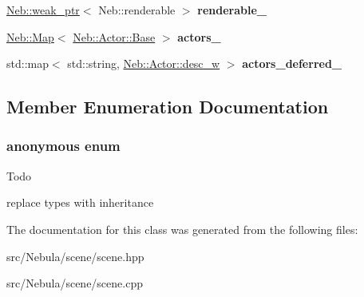 \begin{DoxyCompactItemize}
\item 
\hypertarget{classNeb_1_1Scene_1_1scene_a81751dbac70743eb664dfcf51bc08415}{\hyperlink{classNeb_1_1weak__ptr}{\-Neb\-::weak\-\_\-ptr}$<$ \-Neb\-::renderable $>$ {\bfseries renderable\-\_\-}}\label{classNeb_1_1Scene_1_1scene_a81751dbac70743eb664dfcf51bc08415}

\item 
\hypertarget{classNeb_1_1Scene_1_1scene_a34f0ddb235ae741113bbb9f00eb09bdd}{\hyperlink{classNeb_1_1Map}{\-Neb\-::\-Map}$<$ \hyperlink{classNeb_1_1Actor_1_1Base}{\-Neb\-::\-Actor\-::\-Base} $>$ {\bfseries actors\-\_\-}}\label{classNeb_1_1Scene_1_1scene_a34f0ddb235ae741113bbb9f00eb09bdd}

\item 
\hypertarget{classNeb_1_1Scene_1_1scene_a8c73edd38697448bac54460dc3bb877e}{std\-::map$<$ std\-::string, \*
\hyperlink{classNeb_1_1weak__ptr}{\-Neb\-::\-Actor\-::desc\-\_\-w} $>$ {\bfseries actors\-\_\-deferred\-\_\-}}\label{classNeb_1_1Scene_1_1scene_a8c73edd38697448bac54460dc3bb877e}

\end{DoxyCompactItemize}


\subsection{\-Member \-Enumeration \-Documentation}
\hypertarget{classNeb_1_1Scene_1_1scene_a5faf0bba7354d62e05bbfb7de1e79bf4}{\subsubsection[{anonymous enum}]{\setlength{\rightskip}{0pt plus 5cm}anonymous enum}}\label{classNeb_1_1Scene_1_1scene_a5faf0bba7354d62e05bbfb7de1e79bf4}
\begin{DoxyRefDesc}{\-Todo}
\item[{\bf \-Todo}]replace types with inheritance \end{DoxyRefDesc}


\-The documentation for this class was generated from the following files\-:\begin{DoxyCompactItemize}
\item 
src/\-Nebula/scene/scene.\-hpp\item 
src/\-Nebula/scene/scene.\-cpp\end{DoxyCompactItemize}
